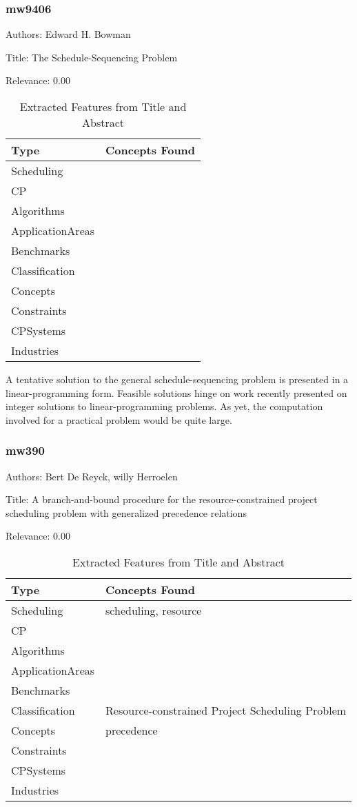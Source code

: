 \subsubsection{mw9406}
\label{mw:mw9406}

Authors: Edward H. Bowman

Title: The Schedule-Sequencing Problem

Relevance:  0.00

{\scriptsize
\begin{longtable}{p{2cm}p{20cm}}
\caption{Extracted Features from Title and Abstract}\\ \toprule
Type & Concepts Found\\ \midrule
\endhead
\bottomrule
\endfoot
Scheduling & \\ 
CP & \\ 
Algorithms & \\ 
ApplicationAreas & \\ 
Benchmarks & \\ 
Classification & \\ 
Concepts & \\ 
Constraints & \\ 
CPSystems & \\ 
Industries & \\ 
\end{longtable}
}

  A tentative solution to the general schedule-sequencing problem is presented in a linear-programming form. Feasible solutions hinge on work recently presented on integer solutions to linear-programming problems. As yet, the computation involved for a practical problem would be quite large.  

\subsubsection{mw390}
\label{mw:mw390}

Authors: Bert De Reyck, willy Herroelen

Title: A branch-and-bound procedure for the resource-constrained project scheduling problem with generalized precedence relations

Relevance:  0.00

{\scriptsize
\begin{longtable}{p{2cm}p{20cm}}
\caption{Extracted Features from Title and Abstract}\\ \toprule
Type & Concepts Found\\ \midrule
\endhead
\bottomrule
\endfoot
Scheduling & scheduling, resource\\ 
CP & \\ 
Algorithms & \\ 
ApplicationAreas & \\ 
Benchmarks & \\ 
Classification & Resource-constrained Project Scheduling Problem\\ 
Concepts & precedence\\ 
Constraints & \\ 
CPSystems & \\ 
Industries & \\ 
\end{longtable}
}



